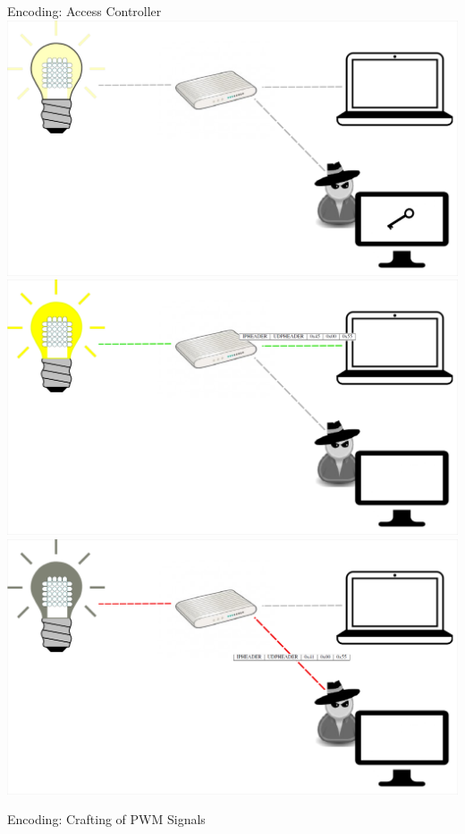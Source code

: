 \documentclass[11pt,t,usepdftitle=false,aspectratio=169]{beamer}
\begin{document}
\begin{frame}{Encoding: Access Controller}
{    }
     {
        \centering
        \includegraphics{img/AttackController_4.png}
    }
     {
        \centering
        \includegraphics{img/AttackController_5.png}
    }
     {
        \centering
        \includegraphics{img/AttackController_6.png}
    }
\end{frame}

\begin{frame}{Encoding: Crafting of PWM Signals}
\end{frame}
\end{document}
